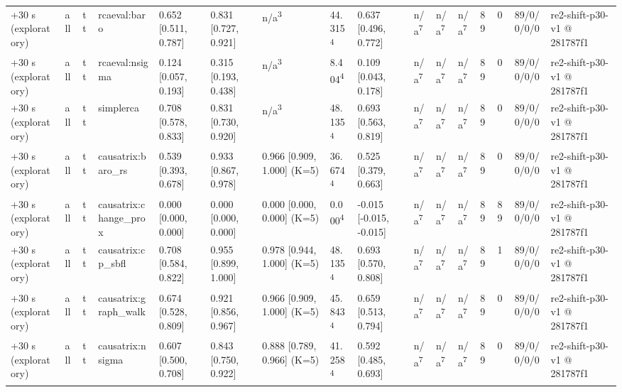 \begin{table}[t]
\begin{tabular}{llllllllllllllll}
+30 s (exploratory) & all & tt & rcaeval:baro & 0.652 [0.511, 0.787] & 0.831 [0.727, 0.921] & n/a\textsuperscript{3} & 44.315\textsuperscript{4} & 0.637 [0.496, 0.772] & n/a\textsuperscript{7} & n/a\textsuperscript{7} & n/a\textsuperscript{7} & 89 & 0 & 89/0/0/0/0 & re2-shift-p30-v1 @ 281787f1 \\
+30 s (exploratory) & all & tt & rcaeval:nsigma & 0.124 [0.057, 0.193] & 0.315 [0.193, 0.438] & n/a\textsuperscript{3} & 8.404\textsuperscript{4} & 0.109 [0.043, 0.178] & n/a\textsuperscript{7} & n/a\textsuperscript{7} & n/a\textsuperscript{7} & 89 & 0 & 89/0/0/0/0 & re2-shift-p30-v1 @ 281787f1 \\
+30 s (exploratory) & all & tt & simplerca & 0.708 [0.578, 0.833] & 0.831 [0.730, 0.920] & n/a\textsuperscript{3} & 48.135\textsuperscript{4} & 0.693 [0.563, 0.819] & n/a\textsuperscript{7} & n/a\textsuperscript{7} & n/a\textsuperscript{7} & 89 & 0 & 89/0/0/0/0 & re2-shift-p30-v1 @ 281787f1 \\
+30 s (exploratory) & all & tt & causatrix:baro\_rs & 0.539 [0.393, 0.678] & 0.933 [0.867, 0.978] & 0.966 [0.909, 1.000] (K=5) & 36.674\textsuperscript{4} & 0.525 [0.379, 0.663] & n/a\textsuperscript{7} & n/a\textsuperscript{7} & n/a\textsuperscript{7} & 89 & 0 & 89/0/0/0/0 & re2-shift-p30-v1 @ 281787f1 \\
+30 s (exploratory) & all & tt & causatrix:change\_prox & 0.000 [0.000, 0.000] & 0.000 [0.000, 0.000] & 0.000 [0.000, 0.000] (K=5) & 0.000\textsuperscript{4} & -0.015 [-0.015, -0.015] & n/a\textsuperscript{7} & n/a\textsuperscript{7} & n/a\textsuperscript{7} & 89 & 89 & 89/0/0/0/0 & re2-shift-p30-v1 @ 281787f1 \\
+30 s (exploratory) & all & tt & causatrix:cp\_sbfl & 0.708 [0.584, 0.822] & 0.955 [0.899, 1.000] & 0.978 [0.944, 1.000] (K=5) & 48.135\textsuperscript{4} & 0.693 [0.570, 0.808] & n/a\textsuperscript{7} & n/a\textsuperscript{7} & n/a\textsuperscript{7} & 89 & 1 & 89/0/0/0/0 & re2-shift-p30-v1 @ 281787f1 \\
+30 s (exploratory) & all & tt & causatrix:graph\_walk & 0.674 [0.528, 0.809] & 0.921 [0.856, 0.967] & 0.966 [0.909, 1.000] (K=5) & 45.843\textsuperscript{4} & 0.659 [0.513, 0.794] & n/a\textsuperscript{7} & n/a\textsuperscript{7} & n/a\textsuperscript{7} & 89 & 0 & 89/0/0/0/0 & re2-shift-p30-v1 @ 281787f1 \\
+30 s (exploratory) & all & tt & causatrix:nsigma & 0.607 [0.500, 0.708] & 0.843 [0.750, 0.922] & 0.888 [0.789, 0.966] (K=5) & 41.258\textsuperscript{4} & 0.592 [0.485, 0.693] & n/a\textsuperscript{7} & n/a\textsuperscript{7} & n/a\textsuperscript{7} & 89 & 0 & 89/0/0/0/0 & re2-shift-p30-v1 @ 281787f1 \\

\end{tabular}
\end{table}
